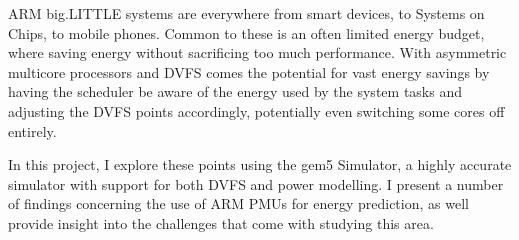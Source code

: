 ARM big.LITTLE systems are everywhere from smart devices, to Systems on Chips, 
to mobile phones. Common to these is an often limited energy budget, where 
saving energy without sacrificing too much performance. With asymmetric 
multicore processors and DVFS comes the potential for vast energy savings by 
having the scheduler be aware of the energy used by the system tasks and 
adjusting the DVFS points accordingly, potentially even switching some cores 
off entirely.

In this project, I explore these points using the gem5 Simulator, a highly 
accurate simulator with support for both DVFS and power modelling. I present a 
number of findings concerning the use of ARM PMUs for energy prediction, as well
provide insight into the challenges that come with studying this area.